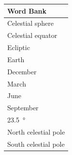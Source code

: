 \documentclass{article}
\begin{document}
\vspace{2cm}

\begin{minipage}{0.3\textwidth}
\centering
\begin{tabular}{|l|}
    \hline
    \textbf{Word Bank}\\
    \hline
    Celestial sphere\\
    Celestial equator\\
    Ecliptic\\
    Earth\\
    December\\
    March\\
    June\\
    September\\
    \SI{23.5}{\degree}\\
    North celestial pole\\
    South celestial pole\\
    \hline
\end{tabular}
\end{minipage}%
\hspace{1cm}
\end{document}
